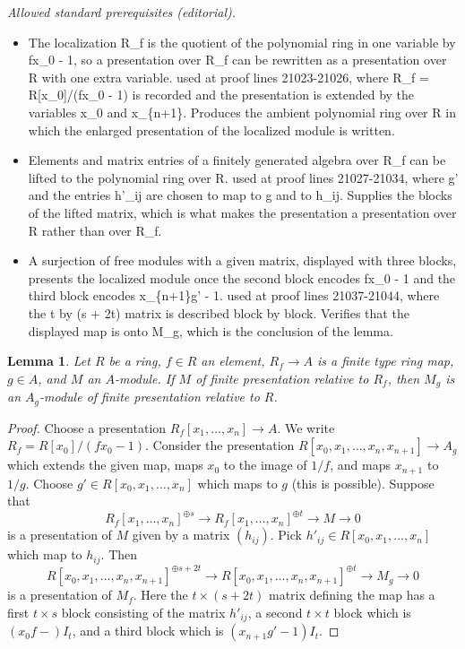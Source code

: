 \documentclass[10pt,a4paper]{amsart}
\theoremstyle{plain}
\newtheorem{lemma}[subsection]{Lemma}
\theoremstyle{definition}
\theoremstyle{remark}
\numberwithin{equation}{subsection}
\begin{document}
\noindent\textit{Allowed standard prerequisites (editorial).}\begin{itemize}
\item The localization R\_f is the quotient of the polynomial ring in one variable by fx\_0 - 1, so a presentation over R\_f can be rewritten as a presentation over R with one extra variable. used at proof lines 21023-21026, where R\_f = R[x\_0]/(fx\_0 - 1) is recorded and the presentation is extended by the variables x\_0 and x\_\{n+1\}. Produces the ambient polynomial ring over R in which the enlarged presentation of the localized module is written.
\item Elements and matrix entries of a finitely generated algebra over R\_f can be lifted to the polynomial ring over R. used at proof lines 21027-21034, where g' and the entries h'\_ij are chosen to map to g and to h\_ij. Supplies the blocks of the lifted matrix, which is what makes the presentation a presentation over R rather than over R\_f.
\item A surjection of free modules with a given matrix, displayed with three blocks, presents the localized module once the second block encodes fx\_0 - 1 and the third block encodes x\_\{n+1\}g' - 1. used at proof lines 21037-21044, where the t by (s + 2t) matrix is described block by block. Verifies that the displayed map is onto M\_g, which is the conclusion of the lemma.
\end{itemize}\medskip
\begin{lemma}
\label{lemma-localize-relative-finite-presentation}
Let $R$ be a ring, $f \in R$ an element, $R_f \to A$ is a finite type ring map,
$g \in A$, and $M$ an $A$-module. If $M$ of finite presentation relative
to $R_f$, then $M_g$ is an $A_g$-module of finite presentation relative
to $R$.
\end{lemma}

\begin{proof}
Choose a presentation $R_f[x_1, \ldots, x_n] \to A$. We write
$R_f = R[x_0]/(fx_0 - 1)$. Consider the presentation
$R[x_0, x_1, \ldots, x_n, x_{n + 1}] \to A_g$ which extends the given
map, maps $x_0$ to the image of $1/f$, and maps $x_{n + 1}$ to $1/g$.
Choose $g' \in R[x_0, x_1, \ldots, x_n]$ which maps to $g$ (this is
possible). Suppose that
$$
R_f[x_1, \ldots, x_n]^{\oplus s} \to
R_f[x_1, \ldots, x_n]^{\oplus t} \to M \to 0
$$
is a presentation of $M$ given by a matrix $(h_{ij})$. Pick
$h'_{ij} \in R[x_0, x_1, \ldots, x_n]$ which map to $h_{ij}$.
Then
$$
R[x_0, x_1, \ldots, x_n, x_{n + 1}]^{\oplus s + 2t} \to
R[x_0, x_1, \ldots, x_n, x_{n + 1}]^{\oplus t} \to M_g \to 0
$$
is a presentation of $M_f$.
Here the $t \times (s + 2t)$ matrix defining the map has a first
$t \times s$ block consisting of the matrix $h'_{ij}$, a second
$t \times t$ block which is $(x_0f - )I_t$, and a third block
which is $(x_{n + 1}g' - 1)I_t$.
\end{proof}
\end{document}
